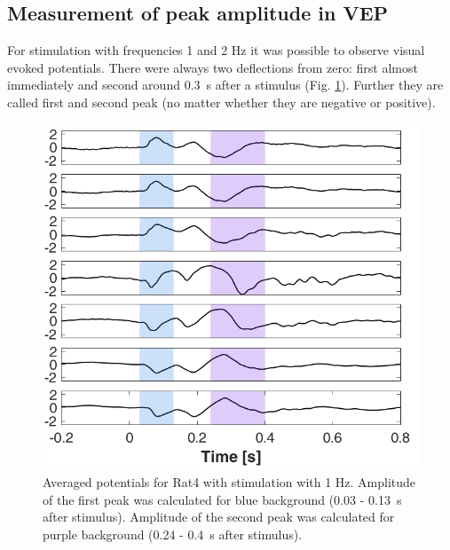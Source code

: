 \documentclass{pracalicmgr}
\begin{document}
    \subsection{Measurement of peak amplitude in VEP}
    For stimulation with frequencies 1 and 2 Hz it was possible to observe visual evoked potentials. There were always two deflections from zero: first almost immediately and second around 0.3~s after a stimulus (Fig. \ref{rys:wybor_pikow}). Further they are called first and second peak (no matter whether they are negative or positive).
    \begin{figure}[H]
    	\begin{center}
    		\includegraphics[scale=0.55]{wybor_pikow.png}
    	\end{center}
    	\caption{Averaged potentials for Rat4 with stimulation with 1 Hz. Amplitude of the first peak was calculated for blue background (0.03 - 0.13~s after stimulus). Amplitude of the second peak was calculated for purple background (0.24 - 0.4~s after stimulus).}
    	\label{rys:wybor_pikow}
    \end{figure} 
    
\end{document}
